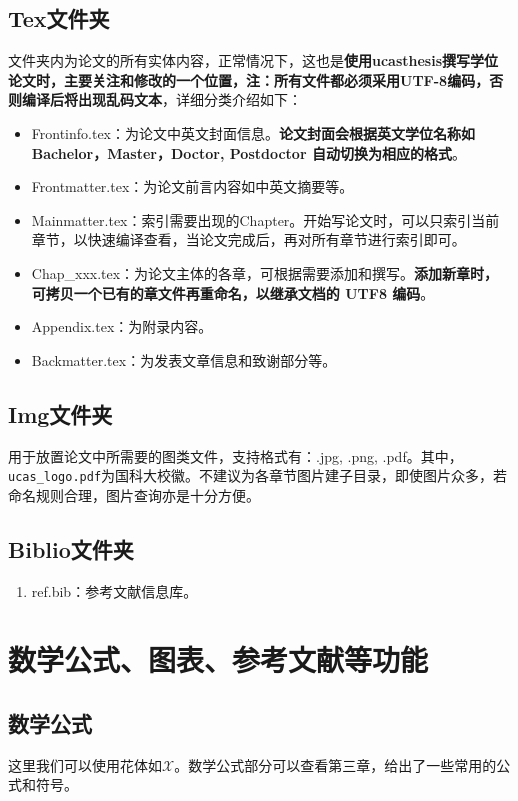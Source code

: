 \subsection{Tex文件夹}

文件夹内为论文的所有实体内容，正常情况下，这也是\textbf{使用ucasthesis撰写学位论文时，主要关注和修改的一个位置，注：所有文件都必须采用UTF-8编码，否则编译后将出现乱码文本}，详细分类介绍如下：

\begin{itemize}
    \item Frontinfo.tex：为论文中英文封面信息。\textbf{论文封面会根据英文学位名称如Bachelor，Master，Doctor, Postdoctor 自动切换为相应的格式}。
    \item Frontmatter.tex：为论文前言内容如中英文摘要等。
    \item Mainmatter.tex：索引需要出现的Chapter。开始写论文时，可以只索引当前章节，以快速编译查看，当论文完成后，再对所有章节进行索引即可。
    \item Chap{\_}xxx.tex：为论文主体的各章，可根据需要添加和撰写。\textbf{添加新章时，可拷贝一个已有的章文件再重命名，以继承文档的 UTF8 编码}。
    \item Appendix.tex：为附录内容。
    \item Backmatter.tex：为发表文章信息和致谢部分等。
\end{itemize}

\subsection{Img文件夹}

用于放置论文中所需要的图类文件，支持格式有：.jpg, .png, .pdf。其中，\verb|ucas_logo.pdf|为国科大校徽。不建议为各章节图片建子目录，即使图片众多，若命名规则合理，图片查询亦是十分方便。

\subsection{Biblio文件夹}

\begin{enumerate}
    \item ref.bib：参考文献信息库。
\end{enumerate}

\section{数学公式、图表、参考文献等功能}

\subsection{数学公式}
这里我们可以使用花体如$\mathcal{X}$。数学公式部分可以查看第三章，给出了一些常用的公式和符号。

